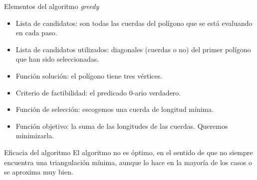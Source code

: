 \documentclass[compress]{beamer}
\begin{document}
\begin{frame}{Elementos del algoritmo \textit{greedy}}
\begin{itemize}
\item Lista de candidatos: son todas las cuerdas del polígono que se está evaluando en cada paso.                                     

\item Lista de candidatos utilizados: diagonales (cuerdas o no) del primer polígono que han sido seleccionadas.                                                                         

\item Función solución: el polígono tiene tres vértices.

\item Criterio de factibilidad: el predicado $0$-ario verdadero.

\item Función de selección: escogemos una cuerda de longitud mínima.                      

\item Función objetivo: la suma de las longitudes de las cuerdas. Queremos minimizarla.
\end{itemize}

\end{frame}

\begin{frame}{Eficacia del algoritmo}
El algoritmo no es óptimo, en el sentido de que no siempre encuentra una triangulación mínima, aunque lo hace en la mayoría de los casos o se aproxima muy bien.
\end{frame}
\end{document}
